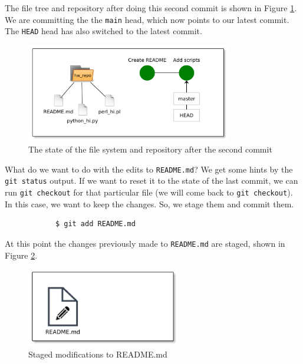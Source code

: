\documentclass[../main/git_course_main.tex]{subfiles}
\begin{document}
	The file tree and repository after doing this second commit is shown in Figure \ref{fig:second_commit}. We are committing the the \verb$main$ head, which now points to our latest commit. The \verb$HEAD$ head has also switched to the latest commit.
	
	\begin{figure}[h!]
		\centering
		\includegraphics[width=0.8\textwidth]{../visualizations/chapter2/c25_repo_second_commit.pdf}
		\caption{The state of the file system and repository after the second commit}
		\label{fig:second_commit}
	\end{figure}
	
	What do we want to do with the edits to \verb$README.md$? We get some hints by the \verb$git status$ output. If we want to reset it to the state of the last commit, we can run \verb$git checkout$ for that particular file (we will come back to \verb$git checkout$). In this case, we want to keep the changes. So, we stage them and commit them.
	
	\begin{codebox}
		\begin{lstlisting}
			$ git add README.md
		\end{lstlisting}
	\end{codebox}
	
	At this point the changes previously made to \verb$README.md$ are staged, shown in Figure \ref{fig:third_stage}.
	
	\begin{figure}[h!]
		\centering
		\includegraphics[width=0.6\textwidth]{../visualizations/chapter2/261_stage_modified_readme.pdf}
		\caption{Staged modifications to README.md}
		\label{fig:third_stage}
	\end{figure}
	
\end{document}
